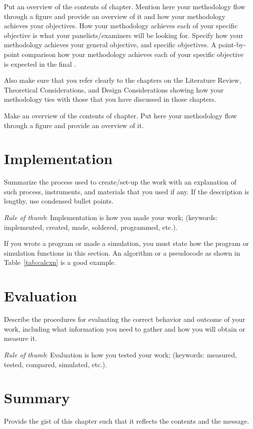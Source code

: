 Put an overview of the contents of chapter. Mention here your methodology flow through a figure and provide an overview of it and how your methodology achieves your objectives.  How your methodology achieves each of your specific objective is what your panelists/examiners will be looking for.  Specify how your methodology achieves your general objective, and specific objectives.  A point-by-point comparison how your methodology achieves each of your specific objective is expected in the final \documentType.

Also make sure that you refer clearly to the chapters on the Literature Review, Theoretical Considerations, and Design Considerations showing how your methodology ties with those that you have discussed in those chapters.

Make an overview of the contents of chapter. Put here your methodology flow through a figure and provide an overview of it.  
\section{Implementation}
\label{sec:implement}

Summarize the process used to create/set-up the work with an explanation of such process, instruments, and materials that you used if any. If the description is lengthy, use condensed bullet points. 

\noindent \textit{Rule of thumb}: Implementation is how you made your  work; (keywords: implemented, created, made, soldered, programmed, etc.).

If you wrote a program or made a simulation, you must state how the program or simulation functions in this section.	An algorithm or a pseudocode as shown in Table~\ref{tab:calcxn} is a good example.


\graytx{\Blindtext}



\section{Evaluation}
\label{sec:evaluate}

Describe the procedures for evaluating the correct behavior and outcome of your  work, including what information you need to gather and how you will obtain or measure it.  

\textit{Rule of thumb}: Evaluation is how you tested your  work; (keywords: measured, tested, compared, simulated, etc.).

\graytx{\Blindtext}



\section{Summary}

Provide the gist of this chapter such that it reflects the contents and the message.
